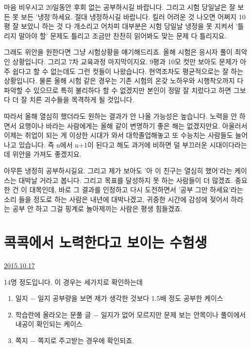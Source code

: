 마음 비우시고 20일동안 후회 없는 공부하시길 바랍니다.
그리고 시험 당일날은 잘 보든 못 보든 '냉정'하세요. 절대 냉정하시길 바랍니다.
킬러 어려운 것 나오면 어쩌지 10평 잘 보았니 하는 것 다 개소리고
어차피 대부분은 시험 당일날 냉정을 못 지켜서 '틀리지 말아야 할' 문제도 틀리고
조금만 찬찬히 읽어봐도 맞는 문제 다 틀리지요.
\vspace{5mm}

그래도 위안을 원한다면 그냥 시험상황을 얘기해드리죠.
올해 시험은 응시자 풀이 최악인 상황입니다. 그리고 7차 교육과정 마지막이지요.
9평과 10모 컷만 보아도 문제가 아주 쉽다고 할 수 없는데도 그런 컷들이 나왔습니다. 현역조차도 평균적으로는 잘 하는 상황입니다.
물론 올해 시험 같은 경우는 기존 시험의 온갖 노하우와 시행착오까지 다 파악할 수 있으므로 특히 불리하다 할 수 없겠지만
본인이 정말 잘 치렀다고 하면 그보다 더 잘 치른 괴수들을 목격하게 될 것입니다.
\vspace{5mm}

따라서 올해 열심히 했더라도 원하는 결과가 안 나올 가능성은 높습니다.
노력을 안 하면서 요행이나 바라는 사람에게는 올해 같이 변명하기 좋은 해는 없겠지만요.
아울러서 이제는 취업이 되는 게 이상한 시대가 와서 대학졸업해놓고 또 수능치는 사람들도 늘어나고 있습니다.
즉 n에서 n+1이 된다고 해도 과거에 비하면 덜 부끄러운 시대이다라는 데 위안을 가져도 좋겠지요.
\vspace{5mm}

아무튼 냉정히 공부하시길요. 그리고 제가 보아도 '아 이 친구는 열심히 했어'라는 케이스는 대박날 거라고 봅니다.
그리고 목표를 달성하지 못 하는 사람들이 더 많겠죠.
중요한 건 이 대목인데, 바로 그 결과를 인정하고 다시 도전하면서 '공부 그만 하세요'라는 소리 들을 정도로 하는 사람은 내년에 대박나겠고,
귀중한 시간에 감성에 젖어서 하라는 공부 안 하고 그걸 핑계로 놀아제끼는 사람은 평생 힘들겠죠.
\vspace{5mm}










\section{콕콕에서 노력한다고 보이는 수험생}
\href{https://www.kockoc.com/Apoc/420994}{2015.10.17}

\vspace{5mm}

14명 정도입니다.
이 경우는 세가지로 확인하는데
\vspace{5mm}
\begin{enumerate}
    \item 일지 $-$ 일지 공부량을 보면 제가 생각한 것보다 1.5배 정도 공부한 케이스
    \item 학습란에 올라오는 문풀 글 $-$ 일지가 없어 모르지만 문제 보는 안목이나 풀이에서 내공이 확인되는 케이스
    \item 쪽지 $-$ 쪽지로 주고받는 경우에 확인되죠.
\end{enumerate}
\vspace{5mm}

